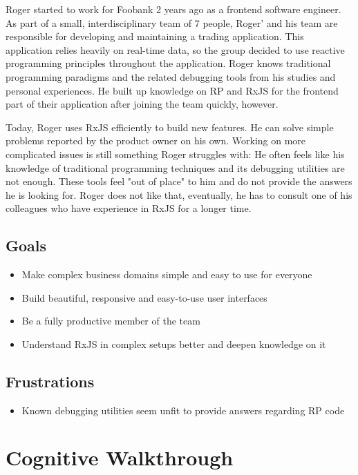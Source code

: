 \documentclass[sigplan,screen,nonacm,review]{acmart}
\begin{document}
Roger started to work for Foobank 2 years ago as a frontend software engineer. As part of a small, interdisciplinary team of 7 people, Roger' and his team are responsible for developing and maintaining a trading application. This application relies heavily on real-time data, so the group decided to use reactive programming principles throughout the application. Roger knows traditional programming paradigms and the related debugging tools from his studies and personal experiences. He built up knowledge on RP and RxJS for the frontend part of their application after joining the team quickly, however.

Today, Roger uses RxJS efficiently to build new features. He can solve simple problems reported by the product owner on his own. Working on more complicated issues is still something Roger struggles with: He often feels like his knowledge of traditional programming techniques and its debugging utilities are not enough. These tools feel "out of place" to him and do not provide the answers he is looking for. Roger does not like that, eventually, he has to consult one of his colleagues who have experience in RxJS for a longer time.

\subsection{Goals}
\begin{itemize}
	\item Make complex business domains simple and easy to use for everyone
	\item Build beautiful, responsive and easy-to-use user interfaces
	\item Be a fully productive member of the team
	\item Understand RxJS in complex setups better and deepen knowledge on it
\end{itemize}

\subsection{Frustrations}
\begin{itemize}
	\item Known debugging utilities seem unfit to provide answers regarding RP code
\end{itemize}


\section{Cognitive Walkthrough}
\label{sec:cogitive-walkthrough-appendix}
\end{document}
